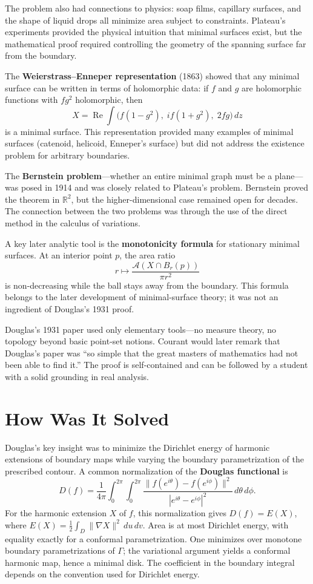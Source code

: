 The problem also had connections to physics: soap films, capillary
surfaces, and the shape of liquid drops all minimize area subject to
constraints. Plateau's experiments provided the physical intuition that
minimal surfaces exist, but the mathematical proof required controlling
the geometry of the spanning surface far from the boundary.

The \textbf{Weierstrass--Enneper representation} (1863) showed that any
minimal surface can be written in terms of holomorphic data: if $f$ and
$g$ are holomorphic functions with $fg^2$ holomorphic, then
\[
X = \operatorname{Re} \int \bigl(f(1-g^2),\; if(1+g^2),\; 2fg\bigr) \, dz
\]
is a minimal surface. This representation provided many examples of
minimal surfaces (catenoid, helicoid, Enneper's surface) but did not
address the existence problem for arbitrary boundaries.

The \textbf{Bernstein problem}---whether an entire minimal graph must be
a plane---was posed in 1914 and was closely related to Plateau's
problem. Bernstein proved the theorem in $\mathbb{R}^2$, but the
higher-dimensional case remained open for decades. The connection
between the two problems was through the use of the direct method in the
calculus of variations.

A key later analytic tool is the \textbf{monotonicity formula} for
stationary minimal surfaces. At an interior point $p$, the area ratio
\[
r \mapsto \frac{\mathcal{A}(X \cap B_r(p))}{\pi r^2}
\]
is non-decreasing while the ball stays away from the boundary. This
formula belongs to the later development of minimal-surface theory; it
was not an ingredient of Douglas's 1931 proof.

Douglas's 1931 paper used only elementary tools---no measure theory, no
topology beyond basic point-set notions. Courant would later remark that
Douglas's paper was ``so simple that the great masters of mathematics
had not been able to find it.'' The proof is self-contained and can be
followed by a student with a solid grounding in real analysis.

\section{How Was It Solved}

Douglas's key insight was to minimize the Dirichlet energy of harmonic
extensions of boundary maps while varying the boundary parametrization
of the prescribed contour. A common normalization of the
\textbf{Douglas functional} is
\[
D(f) = \frac{1}{4\pi} \int_0^{2\pi} \int_0^{2\pi}
\frac{\|f(e^{i\theta}) - f(e^{i\phi})\|^2}
     {|e^{i\theta} - e^{i\phi}|^2} \, d\theta \, d\phi.
\]
For the harmonic extension $X$ of $f$, this normalization gives
$D(f)=E(X)$, where $E(X)=\frac12\int_D\|\nabla X\|^2\,du\,dv$.
Area is at most Dirichlet energy, with equality exactly for a conformal
parametrization. One minimizes over monotone boundary
parametrizations of $\Gamma$; the variational argument yields a
conformal harmonic map, hence a minimal disk. The coefficient in the
boundary integral depends on the convention used for Dirichlet energy.

